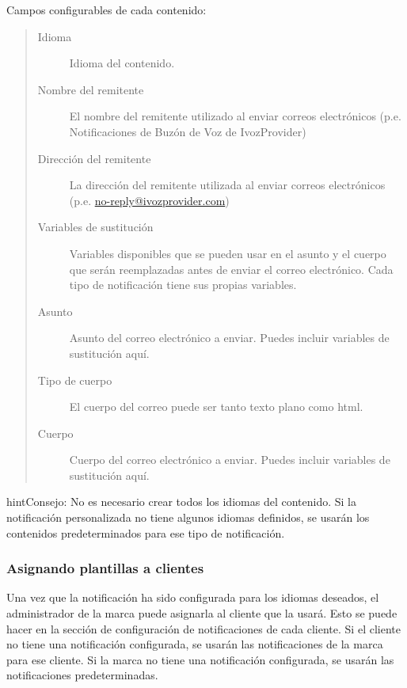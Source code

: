 \documentclass[letterpaper,10pt,spanish]{sphinxmanual}
\begin{document}
Campos configurables de cada contenido:
\begin{quote}
\begin{description}
\item[{Idioma}] \leavevmode
Idioma del contenido.

\item[{Nombre del remitente}] \leavevmode
El nombre del remitente utilizado al enviar correos electrónicos (p.e. Notificaciones de Buzón de Voz de IvozProvider)

\item[{Dirección del remitente}] \leavevmode
La dirección del remitente utilizada al enviar correos electrónicos (p.e. \href{mailto:no-reply@ivozprovider.com}{no-reply@ivozprovider.com})

\item[{Variables de sustitución}] \leavevmode
Variables disponibles que se pueden usar en el asunto y el cuerpo que serán reemplazadas antes de enviar el correo electrónico. Cada tipo de notificación tiene sus propias variables.

\item[{Asunto}] \leavevmode
Asunto del correo electrónico a enviar. Puedes incluir variables de sustitución aquí.

\item[{Tipo de cuerpo}] \leavevmode
El cuerpo del correo puede ser tanto texto plano como html.

\item[{Cuerpo}] \leavevmode
Cuerpo del correo electrónico a enviar. Puedes incluir variables de sustitución aquí.

\end{description}
\end{quote}

\begin{notice}{hint}{Consejo:}
No es necesario crear todos los idiomas del contenido. Si la notificación personalizada no tiene algunos idiomas definidos, se usarán los contenidos predeterminados para ese tipo de notificación.
\end{notice}


\subsubsection{Asignando plantillas a clientes}
\label{administration_portal/brand/settings/notification_templates:assigning-templates-to-clients}
Una vez que la notificación ha sido configurada para los idiomas deseados, el administrador de la marca puede asignarla al cliente que la usará. Esto se puede hacer en la sección de configuración de notificaciones de cada cliente. Si el cliente no tiene una notificación configurada, se usarán las notificaciones de la marca para ese cliente. Si la marca no tiene una notificación configurada, se usarán las notificaciones predeterminadas.
\end{document}
